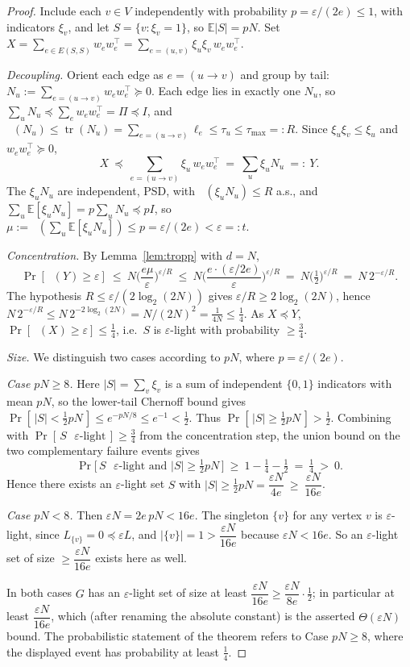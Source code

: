 \documentclass[12pt]{article}
\DeclareMathOperator{\tr}{tr}
\DeclareMathOperator*{\lammax}{\lambda_{\max}}
\newcommand{\eps}{\varepsilon}
\theoremstyle{definition}
\begin{document}
\begin{proof}
Include each $v\in V$ independently with probability $p=\eps/(2e)\le1$, with
indicators $\xi_v$, and let $S=\{v:\xi_v=1\}$, so $\mathbb E|S|=pN$. Set
$X=\sum_{e\in E(S,S)}w_ew_e^{\top}=\sum_{e=(u,v)}\xi_u\xi_v\,w_ew_e^{\top}$.

\emph{Decoupling.} Orient each edge as $e=(u\to v)$ and group by tail:
$N_u:=\sum_{e=(u\to v)}w_ew_e^{\top}\succeq0$. Each edge lies in exactly one
$N_u$, so $\sum_uN_u\preceq\sum_ew_ew_e^{\top}=\Pi\preceq I$, and
$\lammax(N_u)\le\tr(N_u)=\sum_{e=(u\to v)}\ell_e\le\tau_u\le\tau_{\max}=:R$.
Since $\xi_u\xi_v\le\xi_u$ and $w_ew_e^{\top}\succeq0$,
\[
  X\ \preceq\ \sum_{e=(u\to v)}\xi_u\,w_ew_e^{\top}\ =\ \sum_u\xi_uN_u\ =:\ Y .
\]
The $\xi_uN_u$ are independent, PSD, with $\lammax(\xi_uN_u)\le R$ a.s., and
$\sum_u\mathbb E[\xi_uN_u]=p\sum_uN_u\preceq pI$, so $\mu:=\lammax(\sum_u\mathbb
E[\xi_uN_u])\le p=\eps/(2e)<\eps=:t$.

\emph{Concentration.} By Lemma~\ref{lem:tropp} with $d=N$,
\[
  \Pr[\lammax(Y)\ge\eps]
  \ \le\ N\Big(\frac{e\mu}{\eps}\Big)^{\eps/R}
  \ \le\ N\Big(\frac{e\cdot(\eps/2e)}{\eps}\Big)^{\eps/R}
  \ =\ N\Big(\tfrac12\Big)^{\eps/R}
  \ =\ N\,2^{-\eps/R}.
\]
The hypothesis $R\le\eps/(2\log_2(2N))$ gives $\eps/R\ge2\log_2(2N)$, hence
$N\,2^{-\eps/R}\le N\,2^{-2\log_2(2N)}=N/(2N)^2=\tfrac{1}{4N}\le\tfrac14$. As
$X\preceq Y$, $\Pr[\lammax(X)\ge\eps]\le\tfrac14$, i.e.\ $S$ is $\eps$-light with
probability $\ge\tfrac34$.

\emph{Size.} We distinguish two cases according to $pN$, where $p=\eps/(2e)$.

\emph{Case $pN\ge8$.} Here $|S|=\sum_v\xi_v$ is a sum of independent $\{0,1\}$
indicators with mean $pN$, so the lower-tail Chernoff bound gives
$\Pr[\,|S|<\tfrac12pN\,]\le e^{-pN/8}\le e^{-1}<\tfrac12$. Thus
$\Pr[\,|S|\ge\tfrac12pN\,]>\tfrac12$. Combining with
$\Pr[\,S\text{ $\eps$-light}\,]\ge\tfrac34$ from the concentration step, the
union bound on the two complementary failure events gives
\[
  \Pr\big[\,S\text{ $\eps$-light and }|S|\ge\tfrac12pN\,\big]
  \ \ge\ 1-\tfrac14-\tfrac12\ =\ \tfrac14\ >\ 0 .
\]
Hence there exists an $\eps$-light set $S$ with
$|S|\ge\tfrac12pN=\dfrac{\eps N}{4e}\ \ge\ \dfrac{\eps N}{16e}$.

\emph{Case $pN<8$.} Then $\eps N=2e\,pN<16e$. The singleton $\{v\}$ for any
vertex $v$ is $\eps$-light, since $L_{\{v\}}=0\preceq\eps L$, and
$|\{v\}|=1>\dfrac{\eps N}{16e}$ because $\eps N<16e$. So an $\eps$-light set of
size $\ge\dfrac{\eps N}{16e}$ exists here as well.

In both cases $G$ has an $\eps$-light set of size at least $\dfrac{\eps N}{16e}
\ge\dfrac{\eps N}{8e}\cdot\tfrac12$; in particular at least $\dfrac{\eps N}{16e}$,
which (after renaming the absolute constant) is the asserted $\Theta(\eps N)$
bound. The probabilistic statement of the theorem refers to Case $pN\ge8$, where
the displayed event has probability at least $\tfrac14$.
\end{proof}
\end{document}
